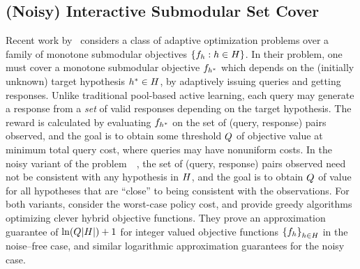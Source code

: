 \subsection{(Noisy) Interactive Submodular Set Cover}  Recent work
by~\citet{guillory10interactive,guillory2011-noisy-interactive-submod-cover} 
considers a class of adaptive
optimization problems over a family of monotone submodular objectives $\left\{f_h
  : h \in H\right\}$.  
%
In their problem, one must cover a monotone submodular objective
$f_{h^*}$ which
depends on the (initially unknown) target hypothesis $h^* \in H$, by adaptively
issuing queries and getting responses.  Unlike traditional pool-based
active learning, each query may generate a response from a \emph{set} of
valid responses depending on the target hypothesis.
The reward is calculated by evaluating $f_{h^*}$ on the set of (query, response)
pairs observed, and the goal is to obtain some threshold $Q$ of
objective value at minimum total query cost, where queries may have
nonuniform costs.
In the noisy variant of the problem~~\citep{guillory2011-noisy-interactive-submod-cover}, the set of (query, response)
pairs observed need not be consistent with any hypothesis in $H$, and the goal
is to obtain $Q$ of value for all hypotheses that are ``close''
to being consistent with the observations.
For both variants, \citeauthor{guillory2011-noisy-interactive-submod-cover}
consider the worst-case policy cost, and 
provide greedy algorithms optimizing clever hybrid objective
functions.
They prove an approximation guarantee of $\ln(Q |H|)+1$ for 
integer valued objective functions $\left\{f_h\right\}_{h\in H}$ in
the noise--free case, and similar logarithmic approximation guarantees
for the noisy case.






